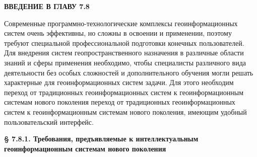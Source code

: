 
\begin{SCn}
\begin{small}

\textbf{ВВЕДЕНИЕ В ГЛАВУ 7.8}

Современные программно-технологические комплексы геоинформационных систем очень эффективны, но сложны в освоении и применении, поэтому требуют специальной профессиональной подготовки конечных пользователей. Для внедрения систем геопространственного назначения в различные области знаний и сферы применения необходимо, чтобы специалисты различного вида деятельности без особых сложностей и дополнительного обучения могли решать характерные для геоинформационных систем задачи.
Для этого необходим переход от традиционных геоинформационных систем к геоинформационным системам нового поколения переход от традиционных геоинформационных систем к геоинформационным системам нового поколения, имеющим удобный пользовательский интерфейс.

\bigskip

\textbf{§ 7.8.1. Требования, предъявляемые к интеллектуальным геоинформационным
                 системам нового поколения}


\begin{scnsubdividing}

    \begin{scnindent}
    \begin{scnsubdividing}
    \end{scnsubdividing}
    \end{scnindent}
    
     \begin{scnindent}
    \begin{scnsubdividing}
    \end{scnsubdividing}
        \end{scnindent}


\end{scnsubdividing}
\end{small}
\end{SCn}
